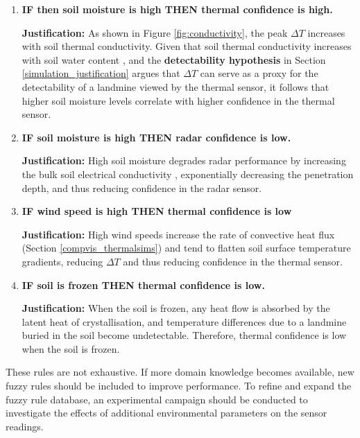         \begin{enumerate}

        
            \item \textbf{IF then soil moisture is high THEN thermal confidence is high.}

                \textbf{Justification:} As shown in Figure \ref{fig:conductivity}, the peak \(\Delta T\) increases with soil thermal conductivity. Given that soil thermal conductivity increases with soil water content \cite{wu2025soil}, and the \textbf{detectability hypothesis} in Section \ref{simulation_justification} argues that \(\Delta T\) can serve as a proxy for the detectability of a landmine viewed by the thermal sensor, it follows that higher soil moisture levels correlate with higher confidence in the thermal sensor.
            
            \item \textbf{IF soil moisture is high THEN radar confidence is low.}

                \textbf{Justification:} High soil moisture degrades radar performance by increasing the bulk soil electrical conductivity \cite{bai2013soils}, exponentially decreasing the penetration  depth\cite{giovanni2008penetration}, and thus reducing confidence in the radar sensor.

            \item \textbf{IF wind speed is high THEN thermal confidence is low}

                \textbf{Justification:} High wind speeds increase the rate of convective heat flux (Section \ref{compvis_thermalsims}) and tend to flatten soil surface temperature gradients, reducing \(\Delta T\) and thus reducing confidence in the thermal sensor.

            \item \textbf{IF soil is frozen THEN thermal confidence is low.}

                \textbf{Justification:} When the soil is frozen, any heat flow is absorbed by the latent heat of crystallisation, and temperature differences due to a landmine buried in the soil become undetectable. Therefore, thermal confidence is low when the soil is frozen.
 
        \end{enumerate}
        

        These rules are not exhaustive. If more domain knowledge becomes available, new fuzzy rules should be included to improve performance. To refine and expand the fuzzy rule database, an experimental campaign should be conducted to investigate the effects of additional environmental parameters on the sensor readings.


